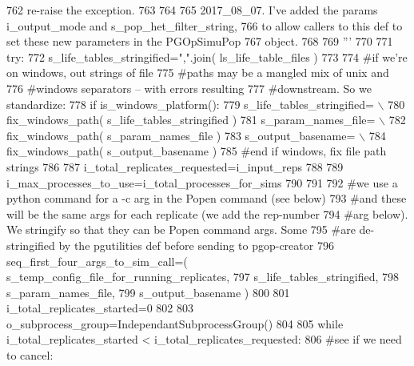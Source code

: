 \begin{DoxyCode}
762 \textcolor{stringliteral}{    re-raise the exception. }
763 \textcolor{stringliteral}{}
764 \textcolor{stringliteral}{     }
765 \textcolor{stringliteral}{    2017\_08\_07.  I've added the params i\_output\_mode and s\_pop\_het\_filter\_string,}
766 \textcolor{stringliteral}{    to allow callers to this def to set these new parameters in the PGOpSimuPop}
767 \textcolor{stringliteral}{    object.}
768 \textcolor{stringliteral}{}
769 \textcolor{stringliteral}{    '''}
770 
771     \textcolor{keywordflow}{try}:
772         s\_life\_tables\_stringified=\textcolor{stringliteral}{","}.join( ls\_life\_table\_files )
773 
774         \textcolor{comment}{#if we're on windows, out strings of file}
775         \textcolor{comment}{#paths may be a mangled mix of unix and }
776         \textcolor{comment}{#windows separators -- with errors resulting}
777         \textcolor{comment}{#downstream.  So we standardize:}
778         \textcolor{keywordflow}{if} is\_windows\_platform():
779             s\_life\_tables\_stringified= \(\backslash\)
780                 fix\_windows\_path( s\_life\_tables\_stringified )
781             s\_param\_names\_file= \(\backslash\)
782                 fix\_windows\_path( s\_param\_names\_file )              
783             s\_output\_basename= \(\backslash\)
784                 fix\_windows\_path( s\_output\_basename )   
785         \textcolor{comment}{#end if windows, fix file path strings}
786 
787         i\_total\_replicates\_requested=i\_input\_reps
788 
789         i\_max\_processes\_to\_use=i\_total\_processes\_for\_sims
790 
791 
792         \textcolor{comment}{#we use a python command for a -c arg in the Popen command (see below)}
793         \textcolor{comment}{#and these will be the same args for each replicate (we add the rep-number}
794         \textcolor{comment}{#arg below).  We stringify so that they can be Popen command args.  Some}
795         \textcolor{comment}{#are de-stringified by the pgutilities def before sending to pgop-creator}
796         seq\_first\_four\_args\_to\_sim\_call=( s\_temp\_config\_file\_for\_running\_replicates,
797                                         s\_life\_tables\_stringified,
798                                         s\_param\_names\_file,
799                                         s\_output\_basename )
800         
801         i\_total\_replicates\_started=0
802 
803         o\_subprocess\_group=IndependantSubprocessGroup()
804 
805         \textcolor{keywordflow}{while} i\_total\_replicates\_started < i\_total\_replicates\_requested:
806             \textcolor{comment}{#see if we need to cancel:  }

\end{DoxyCode}
